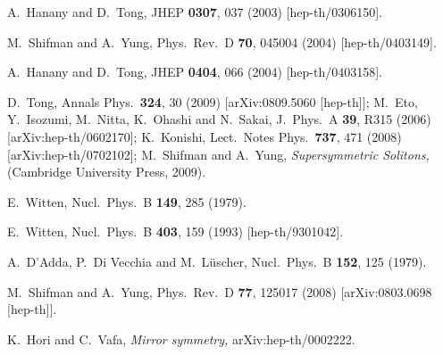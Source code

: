 \documentclass[epsfig,12pt]{article}
\begin{document}
\small
\begin{thebibliography}{99}
\itemsep -2pt

  A.~Hanany and D.~Tong,
  JHEP {\bf 0307}, 037 (2003)
  [hep-th/0306150].

  M.~Shifman and A.~Yung,
  Phys.\ Rev.\ D {\bf 70}, 045004 (2004)
  [hep-th/0403149].

  A.~Hanany and D.~Tong,
  JHEP {\bf 0404}, 066 (2004)
  [hep-th/0403158].

  D.~Tong,
  Annals Phys.\  {\bf 324}, 30 (2009)
  [arXiv:0809.5060 [hep-th]];
  M.~Eto, Y.~Isozumi, M.~Nitta, K.~Ohashi and N.~Sakai,
  J.\ Phys.\ A  {\bf 39}, R315 (2006)
  [arXiv:hep-th/0602170];
  K.~Konishi,
  Lect.\ Notes Phys.\  {\bf 737}, 471 (2008)
  [arXiv:hep-th/0702102];
  M.~Shifman and A.~Yung,
  {\sl Supersymmetric Solitons,}
  (Cambridge University Press, 2009).

  E.~Witten,
  Nucl.\ Phys.\ B {\bf 149}, 285 (1979).

  E.~Witten,
  Nucl.\ Phys.\ B {\bf 403}, 159 (1993)
  [hep-th/9301042].
  
  A.~D'Adda, P.~Di Vecchia and M.~L\"{u}scher,
  Nucl.\ Phys.\  B {\bf 152}, 125 (1979).
  
  M.~Shifman and A.~Yung,
  Phys.\ Rev.\  D {\bf 77}, 125017 (2008)
  [arXiv:0803.0698 [hep-th]].
  
  K.~Hori and C.~Vafa,
  {\em Mirror symmetry,}
  arXiv:hep-th/0002222.
  

\end{thebibliography}
\end{document}
